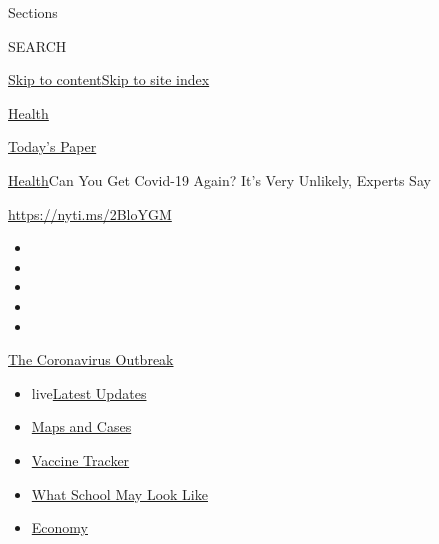 Sections

SEARCH

\protect\hyperlink{site-content}{Skip to
content}\protect\hyperlink{site-index}{Skip to site index}

\href{https://www.nytimes3xbfgragh.onion/section/health}{Health}

\href{https://myaccount.nytimes3xbfgragh.onion/auth/login?response_type=cookie\&client_id=vi}{}

\href{https://www.nytimes3xbfgragh.onion/section/todayspaper}{Today's
Paper}

\href{/section/health}{Health}\textbar{}Can You Get Covid-19 Again? It's
Very Unlikely, Experts Say

\url{https://nyti.ms/2BloYGM}

\begin{itemize}
\item
\item
\item
\item
\item
\end{itemize}

\href{https://www.nytimes3xbfgragh.onion/news-event/coronavirus?action=click\&pgtype=Article\&state=default\&region=TOP_BANNER\&context=storylines_menu}{The
Coronavirus Outbreak}

\begin{itemize}
\tightlist
\item
  live\href{https://www.nytimes3xbfgragh.onion/2020/08/01/world/coronavirus-covid-19.html?action=click\&pgtype=Article\&state=default\&region=TOP_BANNER\&context=storylines_menu}{Latest
  Updates}
\item
  \href{https://www.nytimes3xbfgragh.onion/interactive/2020/us/coronavirus-us-cases.html?action=click\&pgtype=Article\&state=default\&region=TOP_BANNER\&context=storylines_menu}{Maps
  and Cases}
\item
  \href{https://www.nytimes3xbfgragh.onion/interactive/2020/science/coronavirus-vaccine-tracker.html?action=click\&pgtype=Article\&state=default\&region=TOP_BANNER\&context=storylines_menu}{Vaccine
  Tracker}
\item
  \href{https://www.nytimes3xbfgragh.onion/interactive/2020/07/29/us/schools-reopening-coronavirus.html?action=click\&pgtype=Article\&state=default\&region=TOP_BANNER\&context=storylines_menu}{What
  School May Look Like}
\item
  \href{https://www.nytimes3xbfgragh.onion/live/2020/07/31/business/stock-market-today-coronavirus?action=click\&pgtype=Article\&state=default\&region=TOP_BANNER\&context=storylines_menu}{Economy}
\end{itemize}

